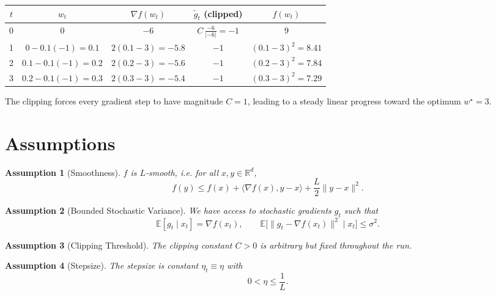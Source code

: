 \documentclass{article}
\newtheorem{assumption}{Assumption}
\newcommand{\E}{\mathbb{E}}
\newcommand{\R}{\mathbb{R}}
\begin{document}
\begin{center}
\begin{tabular}{c|c|c|c|c}
$t$ & $w_t$ & $\nabla f(w_t)$ & $\tilde g_t$ (clipped) & $f(w_t)$ \\
\hline
0 & $0$ & $-6$ & $C\,\frac{-6}{|{-6}|}= -1$ & $9$\\
1 & $0-0.1(-1)=0.1$ & $2(0.1-3)=-5.8$ & $-1$ & $ (0.1-3)^2=8.41$\\
2 & $0.1-0.1(-1)=0.2$ & $2(0.2-3)=-5.6$ & $-1$ & $ (0.2-3)^2=7.84$\\
3 & $0.2-0.1(-1)=0.3$ & $2(0.3-3)=-5.4$ & $-1$ & $ (0.3-3)^2=7.29$\\
\end{tabular}
\end{center}
The clipping forces every gradient step to have magnitude $C=1$, leading to a
steady linear progress toward the optimum $w^\star=3$.

\newpage

\section*{Assumptions}
\begin{assumption}[Smoothness]\label{ass:smooth}
$f$ is $L$‑smooth, i.e. for all $x,y\in\R^d$,
\[
f(y)\le f(x)+\langle\nabla f(x),y-x\rangle+\frac{L}{2}\|y-x\|^2 .
\]
\end{assumption}
\begin{assumption}[Bounded Stochastic Variance]\label{ass:variance}
We have access to stochastic gradients $g_t$ such that
\[
\E[g_t\mid x_t]=\nabla f(x_t),\qquad 
\E\bigl[\|g_t-\nabla f(x_t)\|^2\mid x_t\bigr]\le\sigma^2 .
\]
\end{assumption}
\begin{assumption}[Clipping Threshold]\label{ass:threshold}
The clipping constant $C>0$ is arbitrary but fixed throughout the run.
\end{assumption}
\begin{assumption}[Stepsize]\label{ass:stepsize}
The stepsize is constant $\eta_t\equiv\eta$ with
\[
0<\eta\le \frac{1}{L}.
\]
\end{assumption}
\end{document}
